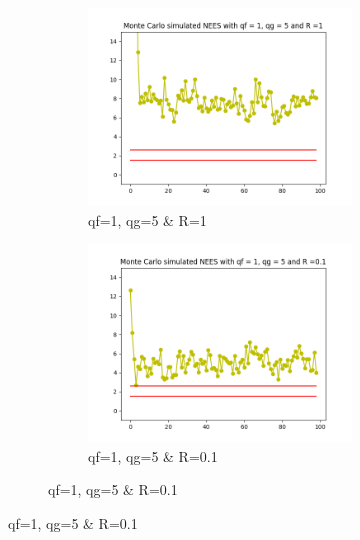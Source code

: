 \documentclass{article}
\begin{document}
        \begin{figure}[H]
            \centering 
            \begin{subfigure}{1\textwidth}  
                \begin{subfigure}{.3\textwidth}  
                    \includegraphics[width=1\linewidth]{./img/mc/acc/nees1_qg5_r1.png}
                    \caption{qf=1, qg=5 \& R=1}
                \end{subfigure}
                \begin{subfigure}{.3\textwidth}  
                    \includegraphics[width=1\linewidth]{./img/mc/acc/nees1_qg5_r01.png}
                    \caption{qf=1, qg=5 \& R=0.1}
                \end{subfigure}

\end{subfigure}
\end{figure}
\end{document}
